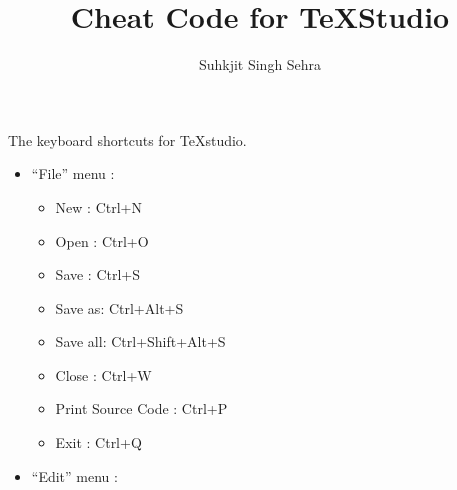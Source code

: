 \documentclass[10pt,legalpaper,twocolumn]{article}
\title{Cheat Code for \TeX Studio}
\author{Suhkjit Singh Sehra}
\begin{document}
\maketitle
The keyboard shortcuts for \TeX studio.


\begin{itemize}
\itemsep1pt\parskip0pt
\item
  ``File'' menu :

  \begin{itemize}
  \itemsep1pt\parskip0pt
  \item
    New : Ctrl+N
  \item
    Open : Ctrl+O
  \item
    Save : Ctrl+S
  \item
    Save as: Ctrl+Alt+S
  \item
    Save all: Ctrl+Shift+Alt+S
  \item
    Close : Ctrl+W
  \item
    Print Source Code : Ctrl+P
  \item
    Exit : Ctrl+Q
  \end{itemize}
\item
  ``Edit'' menu :


\end{itemize}
\end{document}
